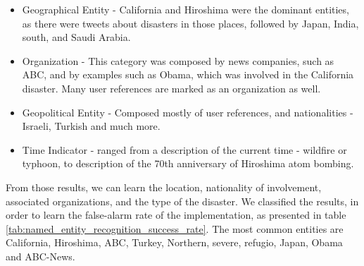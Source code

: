 \documentclass[letterpaper,twocolumn,10pt]{article}
\begin{document}
\begin{itemize}[noitemsep, nolistsep]
	\item Geographical Entity - California and Hiroshima were the dominant entities, as there were tweets about disasters in those places, followed by Japan, India, south, and Saudi Arabia.
	\item Organization - This category was composed by news companies, such as ABC, and by examples such as Obama, which was involved in the California disaster. Many user references are marked as an organization as well.
	\item Geopolitical Entity - Composed mostly of user references, and nationalities - Israeli, Turkish and much more.
	\item Time Indicator - ranged from a description of the current time - wildfire or typhoon, to description of the 70th anniversary of Hiroshima atom bombing.
\end{itemize}
From those results, we can learn the location, nationality of involvement, associated organizations, and  the type of the disaster. We classified the results, in order to learn the false-alarm rate of the implementation, as presented in table  \ref{tab:named_entity_recognition_success_rate}. The most common entities are California, Hiroshima, ABC, Turkey, Northern, severe, refugio, Japan, Obama and ABC-News.

\begin{table}[H]
	\caption{Named Entity Recognition Success Rate}
	\label{tab:named_entity_recognition_success_rate}
	\begin{center}
	\end{center}
\end{table}
\end{document}
